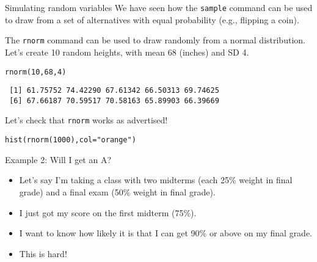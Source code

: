 \documentclass{beamer}\usepackage[]{graphicx}\usepackage[]{color}
\makeatletter
\newcommand{\hlnum}[1]{\textcolor[rgb]{0.824,0.412,0.118}{#1}}%
\newcommand{\hlstr}[1]{\textcolor[rgb]{1,0.894,0.71}{#1}}%
\newcommand{\hlstd}[1]{\textcolor[rgb]{1,0.894,0.769}{#1}}%
\newcommand{\hlkwc}[1]{\textcolor[rgb]{0.78,0.941,0.545}{#1}}%
\newcommand{\hlkwd}[1]{\textcolor[rgb]{1,0.78,0.769}{#1}}%
\newenvironment{kframe}{%
 \def\at@end@of@kframe{}%
 \ifinner\ifhmode%
  \def\at@end@of@kframe{\end{minipage}}%
  \begin{minipage}{\columnwidth}%
 \fi\fi%
 \def\FrameCommand##1{\hskip\@totalleftmargin \hskip-\fboxsep
 \colorbox{shadecolor}{##1}\hskip-\fboxsep
     \hskip-\linewidth \hskip-\@totalleftmargin \hskip\columnwidth}%
 \MakeFramed {\advance\hsize-\width
   \@totalleftmargin\z@ \linewidth\hsize
   \@setminipage}}%
 {\par\unskip\endMakeFramed%
 \at@end@of@kframe}
\newenvironment{knitrout}{}{} %
\makeatother
\begin{document}
\begin{darkframes}
    \begin{frame}[fragile]{Simulating random variables}
      We have seen how the \texttt{sample} command can be used to draw from a set of alternatives with equal probability (e.g., flipping a coin).

      The \texttt{rnorm} command can be used to draw randomly from a normal distribution. Let's create 10 random heights, with mean 68 (inches) and SD 4.
\begin{knitrout}
\begin{kframe}
\begin{alltt}
\hlkwd{rnorm}\hlstd{(}\hlnum{10}\hlstd{,} \hlnum{68}\hlstd{,} \hlnum{4}\hlstd{)}
\end{alltt}
\begin{verbatim}
 [1] 61.75752 74.42290 67.61342 66.50313 69.74625
 [6] 67.66187 70.59517 70.58163 65.89903 66.39669
\end{verbatim}
\end{kframe}
\end{knitrout}
    \end{frame}

    \begin{frame}
      Let's check that \texttt{rnorm} works as advertised!

\begin{knitrout}
\begin{kframe}
\begin{alltt}
\hlkwd{hist}\hlstd{(}\hlkwd{rnorm}\hlstd{(}\hlnum{1000}\hlstd{),} \hlkwc{col}\hlstd{=}\hlstr{"orange"}\hlstd{)}
\end{alltt}
\end{kframe}


\end{knitrout}
    \end{frame}

    \begin{frame}{Example 2: Will I get an A?}
      \begin{itemize}[<+->]
        \item Let's say I'm taking a class with two midterms (each 25\% weight in final grade) and a final exam (50\% weight in final grade).
        \item I just got my score on the first midterm (75\%).
        \item I want to know how likely it is that I can get 90\% or above on my final grade.
        \item This is hard!
      \end{itemize}
    \end{frame}


\end{darkframes}
\end{document}
